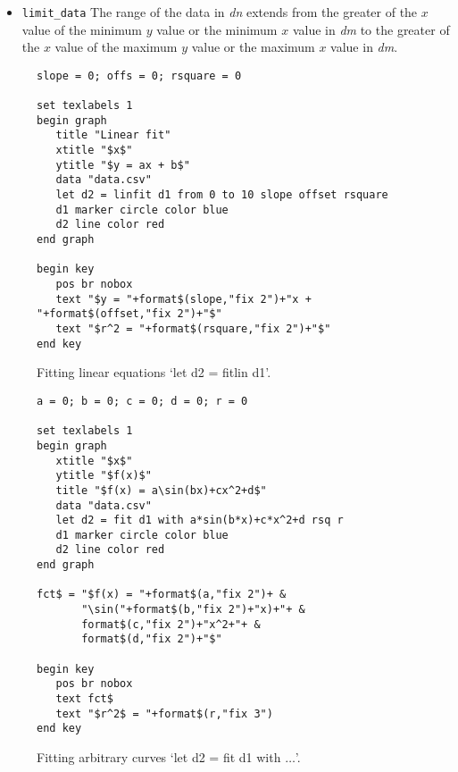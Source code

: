 \begin{commanddescription}
\begin{itemize}
\item \texttt{limit\_data} The range of the data in \textit{dn} extends from the greater of the $x$ value of the minimum $y$ value or the minimum $x$ value in \textit{dm} to the greater of the $x$ value of the maximum $y$ value or the maximum $x$ value in \textit{dm}.
\end{itemize}

\begin{figure}[tb]
\begin{minipage}[c]{9.2cm}
\begin{Verbatim}
slope = 0; offs = 0; rsquare = 0

set texlabels 1
begin graph
   title "Linear fit"
   xtitle "$x$"
   ytitle "$y = ax + b$"
   data "data.csv"
   let d2 = linfit d1 from 0 to 10 slope offset rsquare
   d1 marker circle color blue
   d2 line color red
end graph

begin key
   pos br nobox
   text "$y = "+format$(slope,"fix 2")+"x + "+format$(offset,"fix 2")+"$"
   text "$r^2 = "+format$(rsquare,"fix 2")+"$"
end key
\end{Verbatim}
\end{minipage}
\hfill
\begin{minipage}[c]{7cm}
\mbox{}
\end{minipage}
\caption{\label{fig:fitlin}Fitting linear equations `let d2 = fitlin d1'.}
\end{figure}

\begin{figure}[tb]
\begin{minipage}[c]{8cm}
\begin{Verbatim}
a = 0; b = 0; c = 0; d = 0; r = 0

set texlabels 1
begin graph
   xtitle "$x$"
   ytitle "$f(x)$"
   title "$f(x) = a\sin(bx)+cx^2+d$"
   data "data.csv"
   let d2 = fit d1 with a*sin(b*x)+c*x^2+d rsq r
   d1 marker circle color blue
   d2 line color red
end graph

fct$ = "$f(x) = "+format$(a,"fix 2")+ &
       "\sin("+format$(b,"fix 2")+"x)+"+ &
       format$(c,"fix 2")+"x^2+"+ &
       format$(d,"fix 2")+"$"

begin key
   pos br nobox
   text fct$
   text "$r^2$ = "+format$(r,"fix 3")
end key
\end{Verbatim}
\end{minipage}
\hfill
\begin{minipage}[c]{7cm}
\mbox{}
\end{minipage}
\caption{\label{fig:fitfct}Fitting arbitrary curves `let d2 = fit d1 with $\ldots$'.}
\end{figure}


\end{commanddescription}
